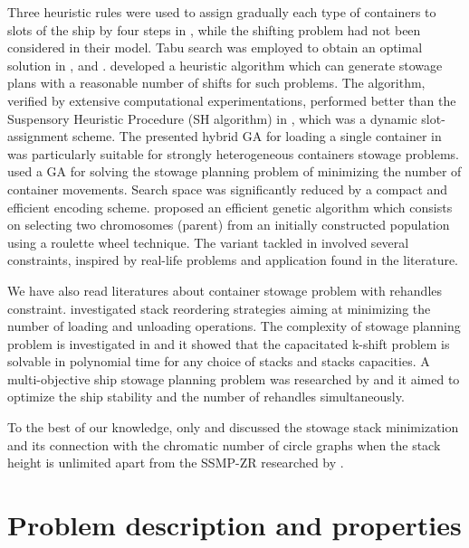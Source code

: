\documentclass[review,3p,times,authoryear,12pt]{elsarticle}
\begin{document}
Three heuristic rules were used to assign gradually each type of containers to slots of the ship by four steps in \cite{scott1978loading}, while the shifting problem had not been considered in their model.
Tabu search was employed to obtain an optimal solution in \cite{wilson2001container}, \cite{bortfeldt2003parallel} and \cite{monaco2014terminal}.
\cite{ding2015stowage} developed a heuristic algorithm which can generate stowage plans with a reasonable number of shifts for such problems.
The algorithm, verified by extensive computational experimentations, performed better than the Suspensory Heuristic Procedure (SH algorithm) in \cite{avriel1998stowage}, which was a dynamic slot-assignment scheme.
The presented hybrid GA for loading a single container in \cite{bortfeldt2001hybrid} was particularly suitable for strongly heterogeneous containers stowage problems.
\cite{dubrovsky2002genetic}  used a GA for solving the stowage planning problem of minimizing the number of container movements.
Search space was significantly reduced by a compact and efficient encoding scheme.
\cite{kammarti2009evolutionary} proposed an efficient genetic algorithm which consists on selecting two chromosomes (parent) from an initially constructed population using a roulette wheel technique.
The variant tackled in \cite{cohen2017container} involved several constraints, inspired by real-life problems and application found in the literature.

We have also read literatures about container stowage problem with rehandles constraint.
\cite{malucelli2008stack} investigated stack reordering strategies aiming at minimizing the number of loading and unloading operations.
The complexity of stowage planning problem is investigated in \cite{tierney2014complexity} and it showed that the capacitated k-shift problem is solvable in polynomial time for any choice of stacks and stacks capacities.
A multi-objective ship stowage planning problem was researched by \cite{zhang2016multiobjective} and it aimed to optimize the ship stability and the number of rehandles simultaneously.

To the best of our knowledge, only \cite{avriel2000container} and \cite{jensen2010complexity} discussed the stowage stack minimization and its connection with the chromatic number of circle graphs when the stack height is unlimited apart from the SSMP-ZR researched by \cite{wang2014stowage}.


\section{Problem description and properties}
\label{sec:pd}
\end{document}
